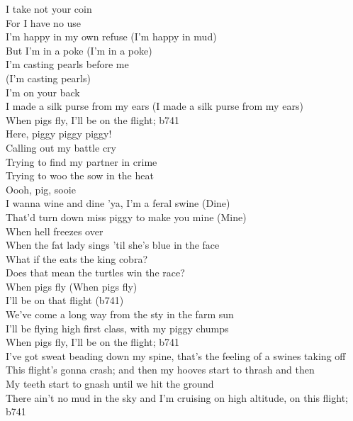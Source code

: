 I take not your coin\\
For I have no use\\
I'm happy in my own refuse (I'm happy in mud)\\

But I'm in a poke (I'm in a poke)\\
I'm casting pearls before me\\
(I'm casting pearls)\\
I'm on your back\\
I made a silk purse from my ears (I made a silk purse from my ears)\\

When pigs fly, I'll be on the flight; b741\\

Here, piggy piggy piggy!\\

Calling out my battle cry\\
Trying to find my partner in crime\\
Trying to woo the sow in the heat\\
Oooh, pig, sooie\\

I wanna wine and dine 'ya, I'm a feral swine (Dine)\\
That'd turn down miss piggy to make you mine (Mine)\\

When hell freezes over\\
When the fat lady sings 'til she's blue in the face\\
What if the  eats the king cobra?\\
Does that mean the turtles win the race?\\

When pigs fly (When pigs fly)\\
I'll be on that flight (b741)\\

We've come a long way from the sty in the farm sun\\
I'll be flying high first class, with my piggy chumps\\

When pigs fly, I'll be on the flight; b741\\

I've got sweat beading down my spine, that's the feeling of a swines taking off\\
This flight's gonna crash; and then my hooves start to thrash and then\\
My teeth start to gnash until we hit the ground\\
There ain't no mud in the sky and I'm cruising on high altitude, on this flight; b741\\

